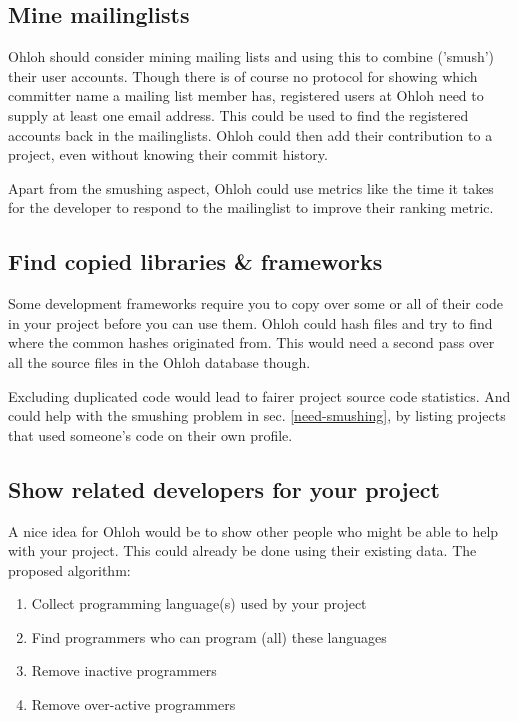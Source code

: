 \documentclass{sig-alternate}
\begin{document}
\subsection{Mine mailinglists}\label{sec:mine-ml}

Ohloh should consider mining mailing lists and using this to combine ('smush') their user accounts. Though there is of course no protocol for showing which committer name a mailing list member has, registered users at Ohloh need to supply at least one email address. This could be used to find the registered accounts back in the mailinglists. Ohloh could then add their contribution to a project, even without knowing their commit history.

Apart from the smushing aspect, Ohloh could use metrics like the time it takes for the developer to respond to the mailinglist to improve their ranking metric.


\subsection{Find copied libraries \& frameworks}
Some development frameworks require you to copy over some or all of their code in your project before you can use them. Ohloh could hash files and try to find where the common hashes originated from. This would need a second pass over all the source files in the Ohloh database though.

Excluding duplicated code would lead to fairer project source code statistics. And could help with the smushing problem in sec. \ref{need-smushing}, by listing projects that used someone's code on their own profile.


\subsection{Show related developers for your project}\label{related-devs}

A nice idea for Ohloh would be to show other people who might be able to help with your project. This could already be done using their existing data. The proposed algorithm:

\begin{enumerate}
  \item Collect programming language(s) used by your project
  \item Find programmers who can program (all) these languages
  \item Remove inactive programmers
  \item Remove over-active programmers
\end{enumerate}
\end{document}
